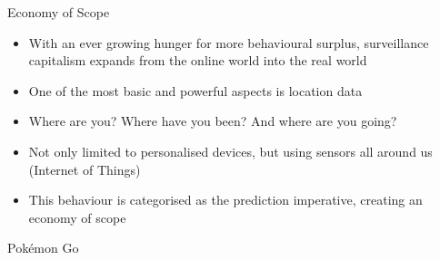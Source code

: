 \documentclass[aspectratio=169]{beamer}
\begin{document}
    {%
    \begin{frame}{Economy of Scope}
        \begin{itemize}
            \item With an ever growing hunger for more behavioural surplus,
                surveillance capitalism expands from the online world into the
                real world
            \pause{}
            \item One of the most basic and powerful aspects is location data
            \item Where are you? Where have you been? And where are you going?
            \pause{}
            \item Not only limited to personalised devices, but using sensors
                all around us (Internet of Things)
            \item This behaviour is categorised as the \alert{prediction
                imperative}, creating an economy of scope
        \end{itemize}
    \end{frame}
    }

    {%
    \begin{frame}
        \begin{titlebox}
            \centering
            {Pokémon Go}
        \end{titlebox}
    \end{frame}
    }
\end{document}
